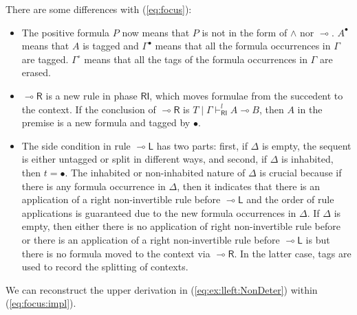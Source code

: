 \documentclass[submission,copyright,creativecommons]{eptcs}
\theoremstyle{definition}
\newcommand{\lright}{{\multimap}\mathsf{R}}
\newcommand{\lleft}{{\multimap}\mathsf{L}}
\newcommand{\lolli}{\multimap}
\newcommand{\RI}{\mathsf{RI}}
\begin{document}
There are some differences with (\ref{eq:focus}):
\begin{itemize}
  \item The positive formula $P$ now means that $P$ is not in the form of $\land$ nor $\lolli$. $A^{\bullet}$ means that $A$ is tagged and $\Gamma^{\bullet}$ means that all the formula occurrences in $\Gamma$ are tagged. $\Gamma^{\circ}$ means that all the tags of the formula occurrences in $\Gamma$ are erased.
  \item $\lright$ is a new rule in phase $\RI$, which moves formulae from the succedent to the context. If the conclusion of $\lright$ is $T \mid \Gamma \vdash^{l}_{\RI} A \lolli B$, then $A$ in the premise is a new formula and tagged by $\bullet$.
  \item The side condition in rule $\lleft$ has two parts: first, if $\Delta$ is empty, the sequent is either untagged or split in different ways, and second, if $\Delta$ is inhabited, then $t = \bullet$.
  The inhabited or non-inhabited nature of $\Delta$ is crucial because if there is any formula occurrence in $\Delta$, then it indicates that there is an application of a right non-invertible rule before $\lleft$ and the order of rule applications is guaranteed due to the new formula occurrences in $\Delta$.
  If $\Delta$ is empty, then either there is no application of right non-invertible rule before or there is an application of a right non-invertible rule before $\lleft$ is but there is no formula moved to the context via $\lright$.
  In the latter case, tags are used to record the splitting of contexts.
\end{itemize}
We can reconstruct the upper derivation in (\ref{eq:ex:lleft:NonDeter}) within (\ref{eq:focus:impl}).
\end{document}
